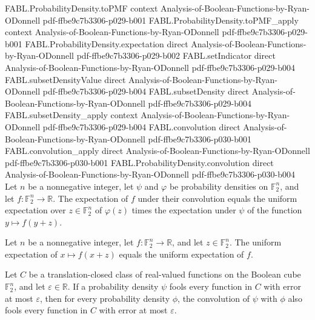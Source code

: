 \begin{theorem}
  {FABL.ProbabilityDensity.toPMF}
  {context}
  {Analysis-of-Boolean-Functions-by-Ryan-ODonnell}
  {pdf-ffbe9c7b3306-p029-b001}
\proofstep
  {FABL.ProbabilityDensity.toPMF_apply}
  {context}
  {Analysis-of-Boolean-Functions-by-Ryan-ODonnell}
  {pdf-ffbe9c7b3306-p029-b001}
\proofstep
  {FABL.ProbabilityDensity.expectation}
  {direct}
  {Analysis-of-Boolean-Functions-by-Ryan-ODonnell}
  {pdf-ffbe9c7b3306-p029-b002}
\proofstep
  {FABL.setIndicator}
  {direct}
  {Analysis-of-Boolean-Functions-by-Ryan-ODonnell}
  {pdf-ffbe9c7b3306-p029-b004}
\proofstep
  {FABL.subsetDensityValue}
  {direct}
  {Analysis-of-Boolean-Functions-by-Ryan-ODonnell}
  {pdf-ffbe9c7b3306-p029-b004}
\proofstep
  {FABL.subsetDensity}
  {direct}
  {Analysis-of-Boolean-Functions-by-Ryan-ODonnell}
  {pdf-ffbe9c7b3306-p029-b004}
\proofstep
  {FABL.subsetDensity_apply}
  {context}
  {Analysis-of-Boolean-Functions-by-Ryan-ODonnell}
  {pdf-ffbe9c7b3306-p029-b004}
\proofstep
  {FABL.convolution}
  {direct}
  {Analysis-of-Boolean-Functions-by-Ryan-ODonnell}
  {pdf-ffbe9c7b3306-p030-b001}
\proofstep
  {FABL.convolution_apply}
  {direct}
  {Analysis-of-Boolean-Functions-by-Ryan-ODonnell}
  {pdf-ffbe9c7b3306-p030-b001}
\proofstep
  {FABL.ProbabilityDensity.convolution}
  {direct}
  {Analysis-of-Boolean-Functions-by-Ryan-ODonnell}
  {pdf-ffbe9c7b3306-p030-b004}
Let $n$ be a nonnegative integer, let $\psi$ and $\varphi$ be probability densities on
$\mathbb F_2^n$, and let $f:\mathbb F_2^n\to\mathbb R$. The expectation of $f$ under
their convolution equals the uniform expectation over $z\in\mathbb F_2^n$ of
$\varphi(z)$ times the expectation under $\psi$ of the function $y\mapsto f(y+z)$.
\end{theorem}

\begin{theorem}
\label{FABL.ProbabilityDensity.expect_translate_add}
\leanok
{}
Let $n$ be a nonnegative integer, let $f:\mathbb F_2^n\to\mathbb R$, and let
$z\in\mathbb F_2^n$. The uniform expectation of $x\mapsto f(x+z)$ equals the uniform
expectation of $f$.
\end{theorem}

\begin{theorem}
\label{FABL.ProbabilityDensity.Fools.convolution_right}
\leanok
{}
Let $C$ be a translation-closed class of real-valued functions on the Boolean cube
$\mathbb{F}_2^n$, and let $\varepsilon\in\mathbb{R}$. If a probability density $\psi$
fools every function in $C$ with error at most $\varepsilon$, then for every probability
density $\phi$, the convolution of $\psi$ with $\phi$ also fools every function in $C$
with error at most $\varepsilon$.
\end{theorem}
